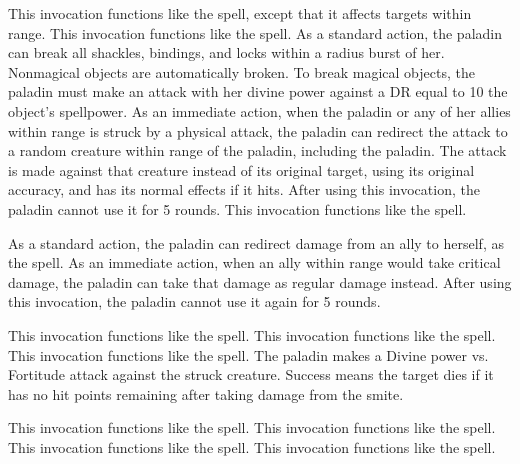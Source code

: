          This invocation functions like the  spell, except that it affects targets within \rngmed range.
         This invocation functions like the  spell.
        As a standard action, the paladin can break all shackles, bindings, and locks within a \arealarge radius burst of her.
        Nonmagical objects are automatically broken.
        To break magical objects, the paladin must make an attack with her divine power against a DR equal to 10 \add the object's spellpower.
        As an immediate action, when the paladin or any of her allies within \rngclose range is struck by a physical attack, the paladin can redirect the attack to a random creature within \rngclose range of the paladin, including the paladin.
        The attack is made against that creature instead of its original target, using its original accuracy, and has its normal effects if it hits.
        After using this invocation, the paladin cannot use it for 5 rounds.
         This invocation functions like the  spell.

        As a standard action, the paladin can redirect damage from an ally to herself, as the  spell.
        As an immediate action, when an ally within \rngmed range would take critical damage, the paladin can take that damage as regular damage instead.
        After using this invocation, the paladin cannot use it again for 5 rounds.

         This invocation functions like the 
        spell.
         This invocation functions like the  spell.
         This invocation functions like the 
        spell.
        The paladin makes a Divine power vs. Fortitude attack against the struck creature.
        Success means the target dies if it has no hit points remaining after taking damage from the smite.

         This invocation functions like the  spell.
         This invocation functions like the  spell.
         This invocation functions like the  spell.
         This invocation functions like the  spell.

